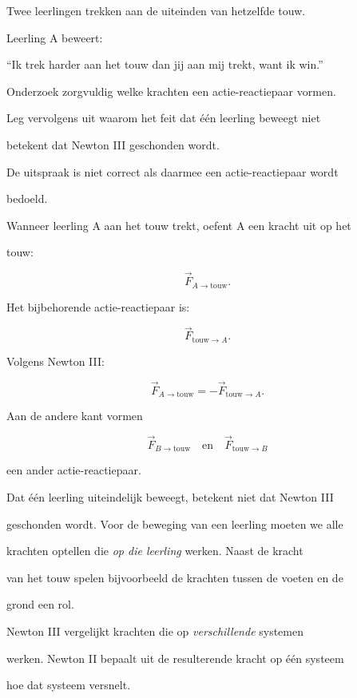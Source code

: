 \documentclass{ximera}
\begin{document}
\begin{oefening}[Touwtrekken]{\oefU}

Twee leerlingen trekken aan de uiteinden van hetzelfde touw.

Leerling A beweert:

\begin{center} ``Ik trek harder aan het touw dan jij aan mij trekt, want ik win.''

\end{center}

Onderzoek zorgvuldig welke krachten een actie-reactiepaar vormen.

Leg vervolgens uit waarom het feit dat één leerling beweegt niet

betekent dat Newton III geschonden wordt.


\begin{oplossing}

De uitspraak is niet correct als daarmee een actie-reactiepaar wordt

bedoeld.

Wanneer leerling A aan het touw trekt, oefent A een kracht uit op het

touw:

\[\vec F_{A\rightarrow\mathrm{touw}}.\]

Het bijbehorende actie-reactiepaar is:

\[\vec F_{\mathrm{touw}\rightarrow A}.\]

Volgens Newton III:

\[\vec F_{A\rightarrow\mathrm{touw}} = -\vec F_{\mathrm{touw}\rightarrow A}.\]

Aan de andere kant vormen

\[\vec F_{B\rightarrow\mathrm{touw}} \quad\text{en}\quad \vec F_{\mathrm{touw}\rightarrow B}\]

een ander actie-reactiepaar.

Dat één leerling uiteindelijk beweegt, betekent niet dat Newton III

geschonden wordt. Voor de beweging van een leerling moeten we alle

krachten optellen die \emph{op die leerling} werken. Naast de kracht

van het touw spelen bijvoorbeeld de krachten tussen de voeten en de

grond een rol.

Newton III vergelijkt krachten die op \emph{verschillende} systemen

werken. Newton II bepaalt uit de resulterende kracht op één systeem

hoe dat systeem versnelt.

\end{oplossing}

\end{oefening}
\end{document}

